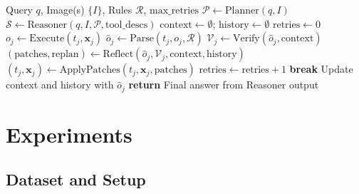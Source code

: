 \documentclass[journal]{IEEEtran}
\begin{document}
\begin{algorithm}[t]
\caption{SR\textsuperscript{2}A Pipeline Execution}
\label{alg:pipeline}
\begin{algorithmic}[1]
\REQUIRE Query $q$, Image(s) $\{I\}$, Rules $\mathcal{R}$, $\text{max\_retries}$
\STATE $\mathcal{P} \leftarrow \text{Planner}(q, I)$ 
\STATE $\mathcal{S} \leftarrow \text{Reasoner}(q, I, \mathcal{P}, \text{tool\_descs})$ 
\STATE $\text{context} \leftarrow \emptyset$; $\text{history} \leftarrow \emptyset$
    \STATE $\text{retries} \leftarrow 0$
    \REPEAT
        \STATE $o_j \leftarrow \text{Execute}(t_j, \mathbf{x}_j)$ 
        \STATE $\hat{o}_j \leftarrow \text{Parse}(t_j, o_j, \mathcal{R})$ 
        \STATE $\mathcal{V}_j \leftarrow \text{Verify}(\hat{o}_j, \text{context})$ 
            \STATE $(\text{patches}, \text{replan}) \leftarrow \text{Reflect}(\hat{o}_j, \mathcal{V}_j, \text{context}, \text{history})$
            \STATE $(t_j, \mathbf{x}_j) \leftarrow \text{ApplyPatches}(t_j, \mathbf{x}_j, \text{patches})$
            \STATE $\text{retries} \leftarrow \text{retries} + 1$
        \ELSE
            \STATE \textbf{break}
        \ENDIF
    \STATE Update context and history with $\hat{o}_j$
\ENDFOR
\STATE \textbf{return} Final answer from Reasoner output
\end{algorithmic}
\end{algorithm}


\section{Experiments}
\label{sec:experiments}

\subsection{Dataset and Setup}
\label{subsec:setup}
\end{document}
